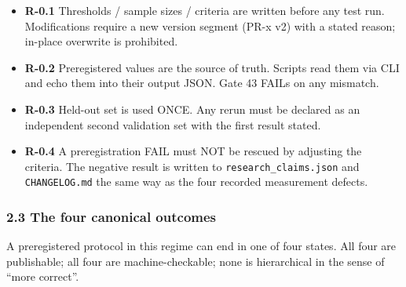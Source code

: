 \documentclass[
]{article}
\newcounter{none} %
\providecommand{\tightlist}{%
  \setlength{\itemsep}{0pt}\setlength{\parskip}{0pt}}
\begin{document}
\begin{itemize}
\tightlist
\item
  \textbf{R-0.1} Thresholds / sample sizes / criteria are written before
  any test run. Modifications require a new version segment (PR-x v2)
  with a stated reason; in-place overwrite is prohibited.
\item
  \textbf{R-0.2} Preregistered values are the source of truth. Scripts
  read them via CLI and echo them into their output JSON. Gate 43 FAILs
  on any mismatch.
\item
  \textbf{R-0.3} Held-out set is used ONCE. Any rerun must be declared
  as an independent second validation set with the first result stated.
\item
  \textbf{R-0.4} A preregistration FAIL must NOT be rescued by adjusting
  the criteria. The negative result is written to
  \texttt{research\_claims.json} and \texttt{CHANGELOG.md} the same way
  as the four recorded measurement defects.
\end{itemize}

\subsubsection{2.3 The four canonical
outcomes}\label{the-four-canonical-outcomes}

A preregistered protocol in this regime can end in one of four states.
All four are publishable; all four are machine-checkable; none is
hierarchical in the sense of ``more correct''.
\end{document}
